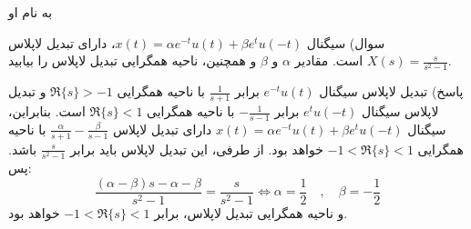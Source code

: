 \documentclass{article}
\begin{document}
\large

\begin{center}
به نام او

\hrulefill
\end{center}

سوال) سیگنال
$
x(t)=\alpha e^{-t}u(t)+\beta e^{t}u(-t)
$،
دارای تبدیل لاپلاس
$
X(s)=\frac{s}{s^2-1}
$
است. مقادیر
$
\alpha
$
و
$
\beta
$
و همچنین، ناحیه همگرایی تبدیل لاپلاس را بیابید.

پاسخ) تبدیل لاپلاس سیگنال
$
e^{-t}u(t)
$
برابر
$
\frac{1}{s+1}
$
با ناحیه همگرایی
$
\Re\{s\}>-1
$
و تبدیل لاپلاس سیگنال
$
e^tu(-t)
$
برابر
$
-\frac{1}{s-1}
$
با ناحیه همگرایی
$
\Re\{s\}<1
$
است. بنابراین، سیگنال
$
x(t)=\alpha e^{-t}u(t)+\beta e^{t}u(-t)
$
دارای تبدیل لاپلاس 
$
\frac{\alpha}{s+1}-\frac{\beta}{s-1}
$
با ناحیه همگرایی
$
-1<\Re\{s\}<1
$
خواهد بود. از طرفی، این تبدیل لاپلاس باید برابر
$
\frac{s}{s^2-1}
$
باشد. پس:
$$
\frac{(\alpha-\beta) s-\alpha-\beta}{s^2-1}=\frac{s}{s^2-1}
\iff
\alpha=\frac{1}{2}
\quad,\quad
\beta=-\frac{1}{2}
$$
و ناحیه همگرایی تبدیل لاپلاس، برابر
$
-1<\Re\{s\}<1
$
خواهد بود.
\end{document}
